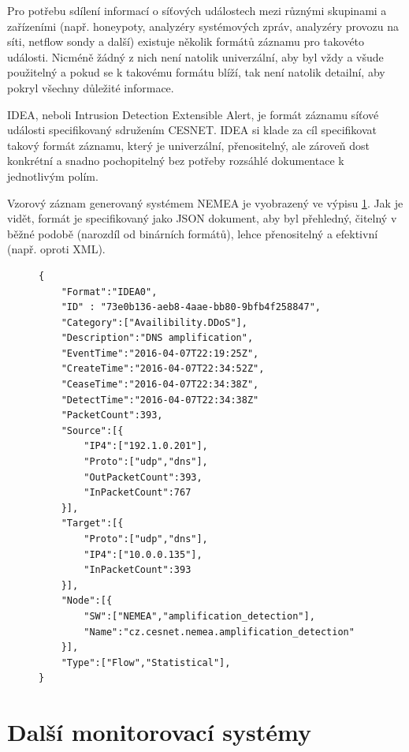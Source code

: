Pro potřebu sdílení informací o síťových událostech mezi různými skupinami a zařízeními (např. honeypoty, analyzéry systémových zpráv, analyzéry provozu na síti, netflow sondy a další) existuje několik formátů záznamu pro takovéto události. Nicméně žádný z nich není natolik univerzální, aby byl vždy a všude použitelný a pokud se k takovému formátu blíží, tak není natolik detailní, aby pokryl všechny důležité informace.

IDEA, neboli Intrusion Detection Extensible Alert, je formát záznamu síťové události specifikovaný sdružením CESNET. IDEA si klade za cíl specifikovat takový formát záznamu, který je univerzální, přenositelný, ale zároveň dost konkrétní a snadno pochopitelný bez potřeby rozsáhlé dokumentace k jednotlivým polím.

Vzorový záznam generovaný systémem NEMEA je vyobrazený ve výpisu \ref{code:idea}. Jak je vidět, formát je specifikovaný jako JSON dokument, aby byl přehledný, čitelný v běžné podobě (narozdíl od binárních formátů), lehce přenositelný a efektivní (např. oproti XML\cite{xmlvsjson}).

\begin{figure}[ht]
\lstset{basicstyle=\small,style=JSON}
\begin{lstlisting}
{
    "Format":"IDEA0",
    "ID" : "73e0b136-aeb8-4aae-bb80-9bfb4f258847",
    "Category":["Availibility.DDoS"],
    "Description":"DNS amplification",
    "EventTime":"2016-04-07T22:19:25Z",
    "CreateTime":"2016-04-07T22:34:52Z",
    "CeaseTime":"2016-04-07T22:34:38Z",
    "DetectTime":"2016-04-07T22:34:38Z"
    "PacketCount":393,
    "Source":[{
        "IP4":["192.1.0.201"],
        "Proto":["udp","dns"],
        "OutPacketCount":393,
        "InPacketCount":767
    }],
    "Target":[{
        "Proto":["udp","dns"],
        "IP4":["10.0.0.135"],
        "InPacketCount":393
    }],
    "Node":[{
        "SW":["NEMEA","amplification_detection"],
        "Name":"cz.cesnet.nemea.amplification_detection"
    }],
    "Type":["Flow","Statistical"],
}
\end{lstlisting}
\label{code:idea}
\end{figure}

\section{Další monitorovací systémy}

